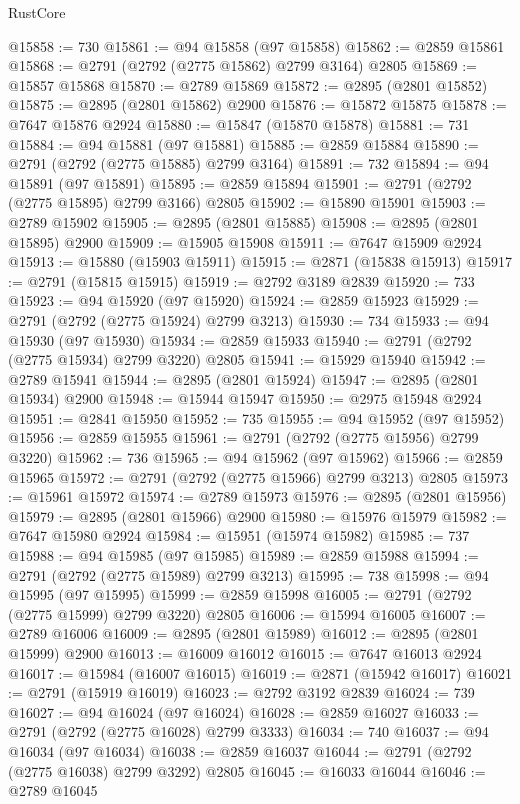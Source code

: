 \begin{lexlean}{RustCore}
\begin{coremodule}
@15858 := 730
@15861 := @94 @15858 (@97 @15858)
@15862 := @2859 @15861
@15868 := @2791 (@2792 (@2775 @15862) @2799 @3164) @2805
@15869 := @15857 @15868
@15870 := @2789 @15869
@15872 := @2895 (@2801 @15852)
@15875 := @2895 (@2801 @15862) @2900
@15876 := @15872 @15875
@15878 := @7647 @15876 @2924
@15880 := @15847 (@15870 @15878)
@15881 := 731
@15884 := @94 @15881 (@97 @15881)
@15885 := @2859 @15884
@15890 := @2791 (@2792 (@2775 @15885) @2799 @3164)
@15891 := 732
@15894 := @94 @15891 (@97 @15891)
@15895 := @2859 @15894
@15901 := @2791 (@2792 (@2775 @15895) @2799 @3166) @2805
@15902 := @15890 @15901
@15903 := @2789 @15902
@15905 := @2895 (@2801 @15885)
@15908 := @2895 (@2801 @15895) @2900
@15909 := @15905 @15908
@15911 := @7647 @15909 @2924
@15913 := @15880 (@15903 @15911)
@15915 := @2871 (@15838 @15913)
@15917 := @2791 (@15815 @15915)
@15919 := @2792 @3189 @2839
@15920 := 733
@15923 := @94 @15920 (@97 @15920)
@15924 := @2859 @15923
@15929 := @2791 (@2792 (@2775 @15924) @2799 @3213)
@15930 := 734
@15933 := @94 @15930 (@97 @15930)
@15934 := @2859 @15933
@15940 := @2791 (@2792 (@2775 @15934) @2799 @3220) @2805
@15941 := @15929 @15940
@15942 := @2789 @15941
@15944 := @2895 (@2801 @15924)
@15947 := @2895 (@2801 @15934) @2900
@15948 := @15944 @15947
@15950 := @2975 @15948 @2924
@15951 := @2841 @15950
@15952 := 735
@15955 := @94 @15952 (@97 @15952)
@15956 := @2859 @15955
@15961 := @2791 (@2792 (@2775 @15956) @2799 @3220)
@15962 := 736
@15965 := @94 @15962 (@97 @15962)
@15966 := @2859 @15965
@15972 := @2791 (@2792 (@2775 @15966) @2799 @3213) @2805
@15973 := @15961 @15972
@15974 := @2789 @15973
@15976 := @2895 (@2801 @15956)
@15979 := @2895 (@2801 @15966) @2900
@15980 := @15976 @15979
@15982 := @7647 @15980 @2924
@15984 := @15951 (@15974 @15982)
@15985 := 737
@15988 := @94 @15985 (@97 @15985)
@15989 := @2859 @15988
@15994 := @2791 (@2792 (@2775 @15989) @2799 @3213)
@15995 := 738
@15998 := @94 @15995 (@97 @15995)
@15999 := @2859 @15998
@16005 := @2791 (@2792 (@2775 @15999) @2799 @3220) @2805
@16006 := @15994 @16005
@16007 := @2789 @16006
@16009 := @2895 (@2801 @15989)
@16012 := @2895 (@2801 @15999) @2900
@16013 := @16009 @16012
@16015 := @7647 @16013 @2924
@16017 := @15984 (@16007 @16015)
@16019 := @2871 (@15942 @16017)
@16021 := @2791 (@15919 @16019)
@16023 := @2792 @3192 @2839
@16024 := 739
@16027 := @94 @16024 (@97 @16024)
@16028 := @2859 @16027
@16033 := @2791 (@2792 (@2775 @16028) @2799 @3333)
@16034 := 740
@16037 := @94 @16034 (@97 @16034)
@16038 := @2859 @16037
@16044 := @2791 (@2792 (@2775 @16038) @2799 @3292) @2805
@16045 := @16033 @16044
@16046 := @2789 @16045

\end{coremodule}
\end{lexlean}
